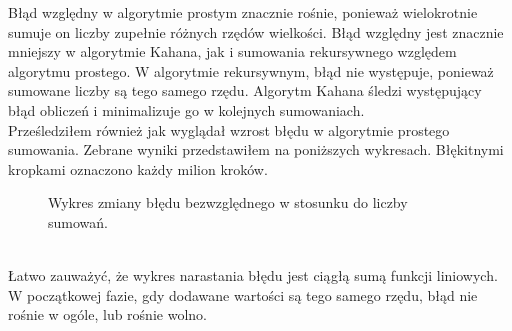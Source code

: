 \documentclass{article}
\begin{document}
        Błąd względny w algorytmie prostym znacznie rośnie, ponieważ wielokrotnie sumuje on liczby zupełnie różnych rzędów wielkości. Błąd względny jest znacznie mniejszy w algorytmie Kahana, jak i sumowania rekursywnego względem algorytmu prostego. W algorytmie rekursywnym, błąd nie występuje, ponieważ sumowane liczby są tego samego rzędu. Algorytm Kahana śledzi występujący błąd obliczeń i minimalizuje go w kolejnych sumowaniach.\\ %
        Prześledziłem również jak wyglądał wzrost błędu w algorytmie prostego sumowania. Zebrane wyniki przedstawiłem na poniższych wykresach. Błękitnymi kropkami oznaczono każdy milion kroków. 
        \begin{figure}[h!]
            \centering
            \caption{Wykres zmiany błędu bezwzględnego w stosunku do liczby sumowań.}
        \end{figure}\\
        Łatwo zauważyć, że wykres narastania błędu jest ciągłą sumą funkcji liniowych. W początkowej fazie, gdy dodawane wartości są tego samego rzędu, błąd nie rośnie w ogóle, lub rośnie wolno. 
\end{document}
